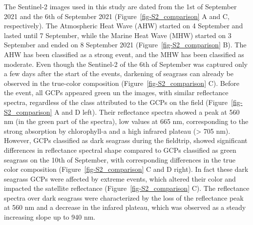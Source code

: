 \documentclass[
  number]{elsarticle}
\begin{document}
The Sentinel-2 images used in this study are dated from the 1st of
September 2021 and the 6th of September 2021
(Figure~\ref{fig-S2_comparison} A and C, respectively). The Atmospheric
Heat Wave (AHW) started on 4 September and lasted until 7 September,
while the Marine Heat Wave (MHW) started on 3 September and ended on 8
September 2021 (Figure~\ref{fig-S2_comparison} B). The AHW has been
classified as a strong event, and the MHW has been classified as
moderate. Even though the Sentinel-2 of the 6th of September was
captured only a few days after the start of the events, darkening of
seagrass can already be observed in the true-color composition
(Figure~\ref{fig-S2_comparison} C). Before the event, all GCPs appeared
green un the images, with similar reflectance spectra, regardless of the
class attributed to the GCPs on the field
(Figure~\ref{fig-S2_comparison} A and D left). Their reflectance spectra
showed a peak at 560 nm (in the green part of the spectra), low values
at 665 nm, corresponding to the strong absorption by chlorophyll-a and a
high infrared plateau (\textgreater{} 705 nm). However, GCPs classified
as dark seagrass during the fieldtrip, showed significant differences in
reflectance spectral shape compared to GCPs classified as green seagrass
on the 10th of September, with corresponding differences in the true
color composition (Figure~\ref{fig-S2_comparison} C and D right). In
fact these dark seagrass GCPs were affected by extreme events, which
altered their color and impacted the satellite reflectance
(Figure~\ref{fig-S2_comparison} C). The reflectance spectra over dark
seagrass were characterized by the loss of the reflectance peak at 560
nm and a decrease in the infared plateau, which was observed as a steady
increasing slope up to 940 nm.
\end{document}
